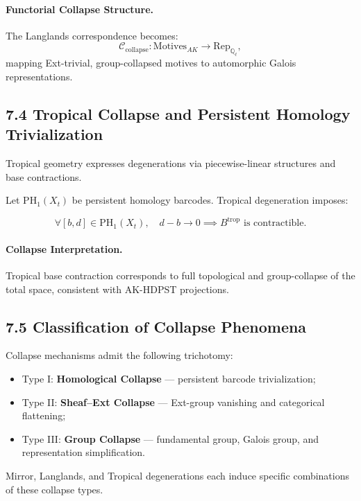 \documentclass[11pt]{article}
\begin{document}
\paragraph{Functorial Collapse Structure.}
The Langlands correspondence becomes:
\[
\mathcal{C}_{\mathrm{collapse}}: \mathrm{Motives}_{AK} \longrightarrow \mathrm{Rep}_{\mathbb{Q}_\ell},
\]
mapping Ext-trivial, group-collapsed motives to automorphic Galois representations.

\subsection*{7.4 Tropical Collapse and Persistent Homology Trivialization}

Tropical geometry expresses degenerations via piecewise-linear structures and base contractions.

Let \( \mathrm{PH}_1(X_t) \) be persistent homology barcodes. Tropical degeneration imposes:

\[
\forall [b,d] \in \mathrm{PH}_1(X_t), \quad d - b \to 0 \implies B^{\mathrm{trop}} \text{ is contractible}.
\]

\paragraph{Collapse Interpretation.}
Tropical base contraction corresponds to full topological and group-collapse of the total space, consistent with AK-HDPST projections.

\subsection*{7.5 Classification of Collapse Phenomena}

Collapse mechanisms admit the following trichotomy:

\begin{itemize}
    \item Type I: \textbf{Homological Collapse} — persistent barcode trivialization;
    \item Type II: \textbf{Sheaf–Ext Collapse} — Ext-group vanishing and categorical flattening;
    \item Type III: \textbf{Group Collapse} — fundamental group, Galois group, and representation simplification.
\end{itemize}

Mirror, Langlands, and Tropical degenerations each induce specific combinations of these collapse types.
\end{document}
